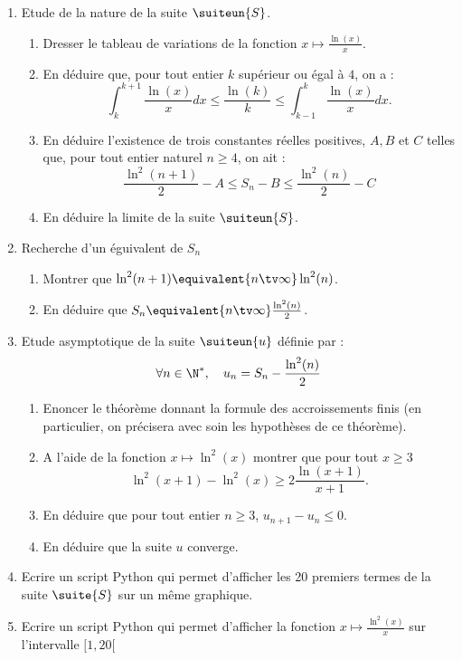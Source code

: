 \begin{probleme}
\begin{enumerate}
\item Etude de la nature de la suite $\suiteun{S}$.
\begin{enumerate}
\item Dresser le tableau  de variations de la fonction $x\mapsto \frac{\ln(x)}{x}$.
\item En déduire que, pour tout entier $k$ supérieur ou égal à $4$, on a : 
$$\int_k^{k+1} \frac{\ln(x)}{x}dx\leq \frac{\ln(k)}{k} \leq \int_{k-1}^{k} \frac{\ln(x)}{x}dx.$$
\item En déduire l'existence de trois constantes réelles positives, $A,B $ et $C$ telles que, pour tout entier naturel $n\geq 4$, on ait : 
$$\frac{\ln^2(n+1)}{2} -A\leq S_n-B \leq \frac{\ln^2(n)}{2} -C$$
\item En déduire la limite de la suite $\suiteun{S}$. 
\end{enumerate}
\item Recherche d'un éguivalent de $S_n$
\begin{enumerate}
\item Montrer que $\ln^2(n+1) \equivalent{n\tv \infty} \ln^2(n)$.
\item En déduire que $S_n\equivalent{n\tv \infty} \frac{\ln^2(n)}{2}$.
\end{enumerate}
\item Etude asymptotique de la suite $\suiteun{u}$ définie par : 
$$\forall n\in \N^*, \quad u_n=S_n -\frac{\ln^2(n)}{2}$$
\begin{enumerate}
\item Enoncer le théorème donnant la formule des accroissements finis (en particulier, on précisera avec soin les hypothèses de ce théorème).
\item A l'aide de la fonction $x \mapsto \ln^2(x) $   montrer que  pour tout $x\geq 3$
$$\ln^2(x+1) -\ln^2(x) \geq 2\frac{\ln(x+1)}{x+1}.$$
\item En déduire  que pour tout entier $n\geq 3$, $u_{n+1} -u_n \leq 0$.
\item En déduire que la suite $u$ converge. 
\end{enumerate}
\item Ecrire un script Python qui permet d'afficher les 20 premiers termes de la suite $\suite{S}$ sur un même graphique. 
\item Ecrire  un script Python qui permet d'afficher la fonction $x\mapsto \frac{\ln^2(x)}{x}$ sur l'intervalle $[1,20[$


\end{enumerate}
\end{probleme}
